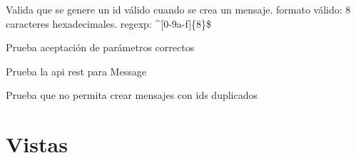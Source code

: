 \documentclass[letterpaper,10pt,spanish]{sphinxmanual}
\begin{document}
\begin{fulllineitems}

\begin{fulllineitems}
\label{\detokenize{modules/tests:apirestv1.tests.MessageTestCase.test_id}}
Valida que se genere un id válido cuando se crea un mensaje.
formato válido: 8 caracteres hexadecimales.
regexp: \textasciicircum{}{[}0-9a-f{]}\{8\}\$

\end{fulllineitems}


\begin{fulllineitems}
\label{\detokenize{modules/tests:apirestv1.tests.MessageTestCase.test_message_params}}
Prueba aceptación de parámetros correctos

\end{fulllineitems}


\begin{fulllineitems}
\label{\detokenize{modules/tests:apirestv1.tests.MessageTestCase.test_rest}}
Prueba la api rest para Message

\end{fulllineitems}


\begin{fulllineitems}
\label{\detokenize{modules/tests:apirestv1.tests.MessageTestCase.test_unique_constraint}}
Prueba que no permita crear mensajes con ids duplicados

\end{fulllineitems}


\end{fulllineitems}



\chapter{Vistas}
\label{\detokenize{modules/views:vistas}}\label{\detokenize{modules/views::doc}}
\end{document}
